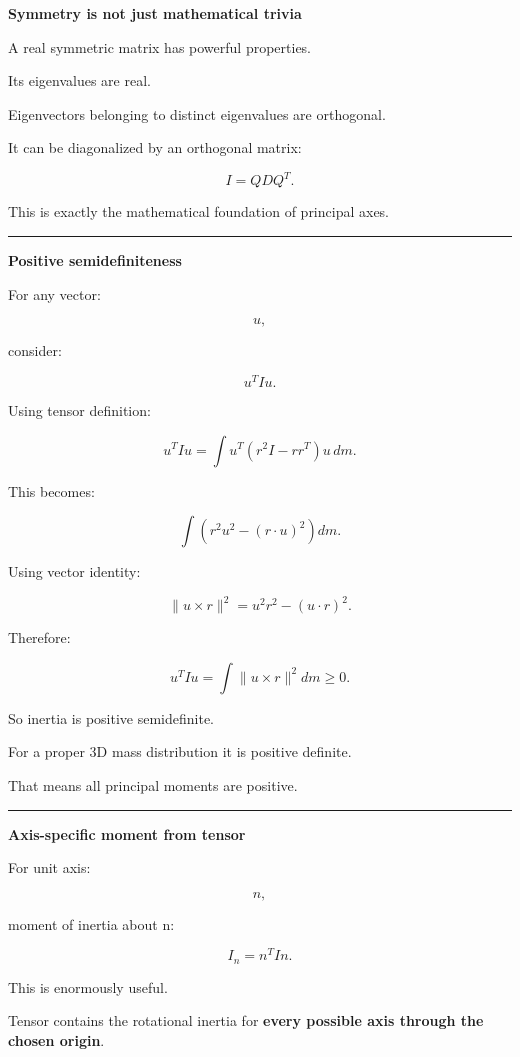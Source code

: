 \textbf{Symmetry is not just mathematical trivia}

A real symmetric matrix has powerful properties.

Its eigenvalues are real.

Eigenvectors belonging to distinct eigenvalues are orthogonal.

It can be diagonalized by an orthogonal matrix:

\[
I=QDQ^T.
\]

This is exactly the mathematical foundation of principal axes.

\begin{center}\rule{0.5\linewidth}{0.5pt}\end{center}

\textbf{Positive semidefiniteness}

For any vector:

\[
u,
\]

consider:

\[
u^TIu.
\]

Using tensor definition:

\[
u^TIu
=
\int
u^T
(r^2I-rr^T)
u\,dm.
\]

This becomes:

\[
\int
(
r^2u^2-(r\cdot u)^2
)
dm.
\]

Using vector identity:

\[
\|u\times r\|^2
=
u^2r^2-(u\cdot r)^2.
\]

Therefore:

\[
\boxed{
u^TIu
=
\int
\|u\times r\|^2dm
\ge0.
}
\]

So inertia is positive semidefinite.

For a proper 3D mass distribution it is positive definite.

That means all principal moments are positive.

\begin{center}\rule{0.5\linewidth}{0.5pt}\end{center}

\textbf{Axis-specific moment from tensor}

For unit axis:

\[
n,
\]

moment of inertia about n:

\[
\boxed{
I_n
=
n^TIn.
}
\]

This is enormously useful.

Tensor contains the rotational inertia for \textbf{every possible axis through the chosen origin}.

